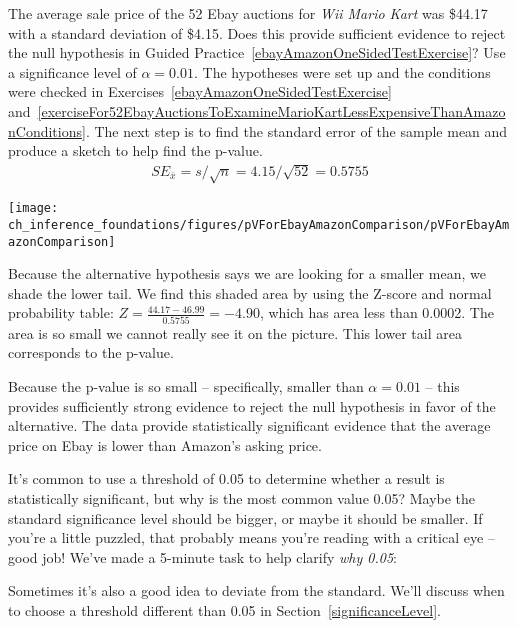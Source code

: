 \begin{example}{The average sale price of the 52 Ebay auctions for \emph{Wii Mario Kart} was \$44.17 with a standard deviation of \$4.15. Does this provide sufficient evidence to reject the null hypothesis in Guided Practice~\ref{ebayAmazonOneSidedTestExercise}? Use a significance level of $\alpha = 0.01$.}
The hypotheses were set up and the conditions were checked in Exercises~\ref{ebayAmazonOneSidedTestExercise} and~\ref{exerciseFor52EbayAuctionsToExamineMarioKartLessExpensiveThanAmazonConditions}. The next step is to find the standard error of the sample mean and produce a sketch to help find the p-value.
\begin{eqnarray*}
SE_{\bar{x}} = s/\sqrt{n} = 4.15/\sqrt{52} = 0.5755
\end{eqnarray*}
\begin{center}
\texttt{[image: ch\_inference\_foundations/figures/pVForEbayAmazonComparison/pVForEbayAmazonComparison]}
\end{center}
Because the alternative hypothesis says we are looking for a smaller mean, we shade the lower tail. We find this shaded area by using the Z-score and normal probability table: $Z = \frac{44.17 - 46.99}{0.5755} = -4.90$, which has area less than 0.0002. The area is so small we cannot really see it on the picture. This lower tail area corresponds to the p-value.

Because the p-value is so small -- specifically, smaller than $\alpha = 0.01$ -- this provides sufficiently strong evidence to reject the null hypothesis in favor of the alternative. The data provide statistically significant evidence that the average price on Ebay is lower than Amazon's asking price.
\end{example}

\begin{termBox}{
It's common to use a threshold of 0.05 to determine whether a result is statistically significant, but why is the most common value 0.05? Maybe the standard significance level should be bigger, or maybe it should be smaller. If you're a little puzzled, that probably means you're reading with a critical eye -- good job! We've made a 5-minute task to help clarify \emph{why 0.05}:
\begin{center}
\end{center}
Sometimes it's also a good idea to deviate from the standard. We'll discuss when to choose a threshold different than 0.05 in Section~\ref{significanceLevel}.\vspace{0.5mm}}
\end{termBox}


